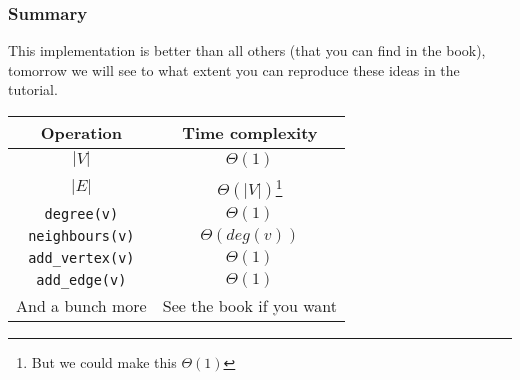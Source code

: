 \begin{frame}
	\frametitle{Summary}

			This implementation is better than all others (that you can find in the book), tomorrow we will see to what extent you can
			reproduce these ideas in the tutorial.
		
		\begin{tabular}{c | c}
		Operation & Time complexity \\
		\midrule
		$|V|$ & $\Theta(1)$ \\
		$|E|$ & $\Theta(|V|)$\footnote{But we could make this $\Theta(1)$} \\
		
		\texttt{degree(v)} & $\Theta(1)$ \\
		\texttt{neighbours(v)} & $\Theta(\mathit{deg}(v))$ \\
		
		\texttt{add\_vertex(v)} & $\Theta(1)$ \\
		\texttt{add\_edge(v)} & $\Theta(1)$ \\
		
		And a bunch more & See the book if you want\\
		\end{tabular}
\end{frame}

